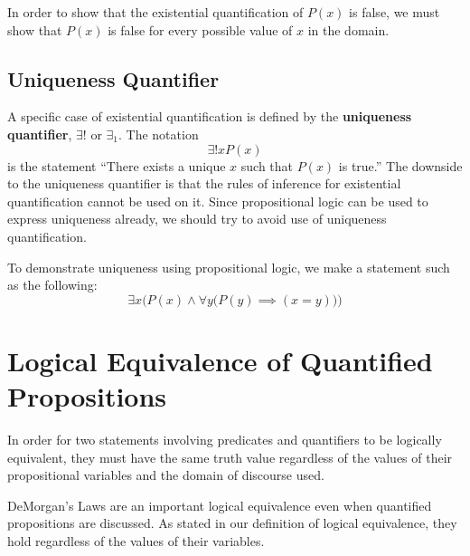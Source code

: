 \begin{note}
  In order to show that the existential quantification of $P(x)$ is false, we must
  show that $P(x)$ is false for every possible value of $x$ in the domain.
\end{note}


\subsection{Uniqueness Quantifier}
A specific case of existential quantification is defined by the
\textbf{uniqueness quantifier}, $\exists!$ or $\exists_1$. The notation
\[ \exists! x P(x) \]
is the statement ``There exists a unique $x$ such that $P(x)$ is true.'' The
downside to the uniqueness quantifier is that the rules of inference for
existential quantification cannot be used on it. Since propositional logic can
be used to express uniqueness already, we should try to avoid use of uniqueness
quantification.

To demonstrate uniqueness using propositional logic, we make a statement such as the following:
\[ \exists x \Big( P(x) \land \forall y \big( P(y) \implies (x=y)\big)\Big) \]

\section{Logical Equivalence of Quantified Propositions}

In order for two statements involving predicates and quantifiers to be logically equivalent,
they must have the same truth value regardless of the values of their propositional variables
and the domain of discourse used.

DeMorgan's Laws are an important logical equivalence even when quantified propositions are discussed.
As stated in our definition of logical equivalence, they hold regardless of the values of their variables.

%
%

